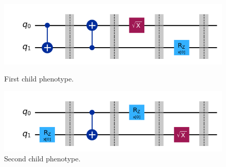 \documentclass[12pt]{article}
\begin{document}
\begin{figure}[h!]
    \begin{minipage}{0.7\textwidth}
        \centering
        \includegraphics[width=\linewidth]{images/child1.png}
        \caption{First child phenotype.}
        \label{fig:1child}
    \end{minipage}
    \hfill
    \begin{minipage}{0.7\textwidth}
        \centering
        \includegraphics[width=\linewidth]{images/child2.png}
        \caption{Second child phenotype.}
        \label{fig:2child}
    \end{minipage}
\end{figure}
\end{document}
